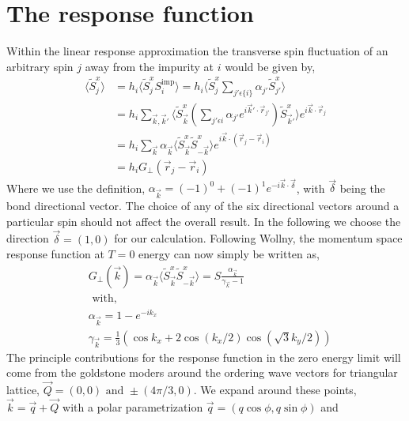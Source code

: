 \documentclass{article}
\newcommand{\tS}{\tilde{S}}
\newcommand{\vk}{\vec{k}}
\newcommand{\vq}{\vec{q}}
\newcommand{\vQ}{\vec{Q}}
\newcommand{\vr}{\vec{r}}
\begin{document}
\section{The response function}
Within the linear response approximation the transverse
spin fluctuation of an arbitrary spin $j$ away from the 
impurity at $i$ would be given by,
\begin{equation}
    \begin{aligned}
        \langle\tS_j^x\rangle &= h_{i}
        \langle\tS^x_jS_i^{\text{imp}}\rangle
        =h_i\langle\tS^x_j\sum_{j'\epsilon\{i\}}
        \alpha_{j'}\tS^x_{j'}\rangle \\
        &=h_i\sum_{\vk,\vk'}
        \langle\tS^x_{\vk}
        \left(\sum_{j'\epsilon{i}}\alpha_{j'}
        e^{i\vk'\cdot\vr_{j'}}\right)
        \tS^x_{\vk'}
        \rangle 
        e^{i\vk\cdot\vr_j} \\
        &=h_i\sum_{\vk}\alpha_{\vk}
        \langle\tS^x_{\vk}\tS^x_{-\vk}\rangle
        e^{i\vk\cdot(\vr_j-\vr_i)} \\
        &=h_iG_\perp(\vr_j-\vr_i)
    \end{aligned}
\end{equation}
Where we use the definition, 
$\alpha_{\vk}=(-1)^0+(-1)^1e^{-i\vk\cdot\vec{\delta}}$,
with $\vec{\delta}$ being the bond directional vector. 
The choice of any of the six directional vectors around 
a particular spin should not affect the overall result.
In the following we choose the direction 
$\vec{\delta}=(1,0)$ for our calculation. Following
Wollny, the momentum space response function at $T=0$
energy can now simply be written as,
\begin{equation}
    \begin{aligned}
        &G_\perp({\vk}) = \alpha_{\vk}
        \langle\tS^x_{\vk}\tS^x_{-\vk}\rangle
        =S\frac{\alpha_{\vk}}{\gamma_{\vk}-1} \\
        &\text{ with,} \\
        &\alpha_{\vk} = 1-e^{-ik_x} \\
        &\gamma_{\vk} = 
        \frac{1}{3}\left(\cos k_x
        +2\cos(k_x/2)\cos(\sqrt{3}k_y/2)\right)
    \end{aligned}
\end{equation}
The principle contributions for the response function 
in the zero energy limit will come from the goldstone
moders around the ordering wave vectors for triangular
lattice, $\vQ=(0,0) \text{ and } \pm(4\pi/3,0)$. 
We expand around these points, $\vk=\vq+\vQ$ with a
polar parametrization $\vq=(q\cos\phi,q\sin\phi)$ and
\end{document}
